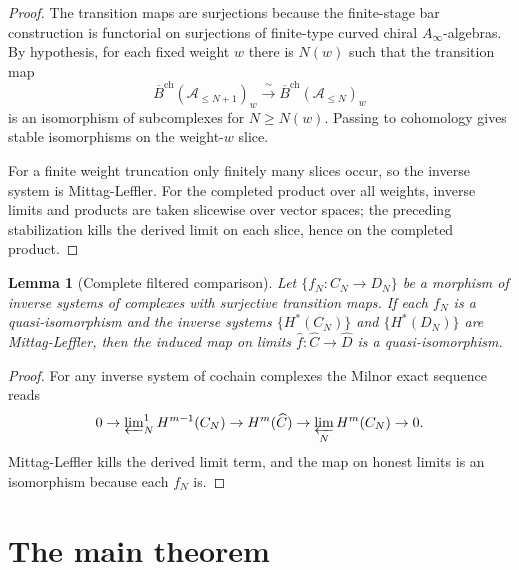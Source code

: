 \documentclass[11pt,reqno]{amsart}
\newtheorem{lemma}[theorem]{Lemma}
\theoremstyle{definition}
\theoremstyle{remark}
\newcommand{\cA}{\mathcal{A}}
\newcommand{\barB}{\overline{B}}
\newcommand{\Ainf}{A_\infty}
\numberwithin{equation}{section}
\begin{document}
\begin{proof}
The transition maps are surjections because the finite-stage bar
construction is functorial on surjections of finite-type curved
chiral $\Ainf$-algebras. By hypothesis, for each fixed weight
$w$ there is $N(w)$ such that the transition map
\[
\barB^{\mathrm{ch}}(\cA_{\le N+1})_w \xrightarrow{\ \sim\ }
\barB^{\mathrm{ch}}(\cA_{\le N})_w
\]
is an isomorphism of subcomplexes for $N\ge N(w)$. Passing to
cohomology gives stable isomorphisms on the weight-$w$ slice.

For a finite weight truncation only finitely many slices occur,
so the inverse system is Mittag-Leffler. For the completed
product over all weights, inverse limits and products are taken
slicewise over vector spaces; the preceding stabilization kills
the derived limit on each slice, hence on the completed product.
\end{proof}

\begin{lemma}[Complete filtered comparison]
\label{lem:filtered-comparison}
Let $\{f_N\colon C_N \to D_N\}$ be a morphism of inverse
systems of complexes with surjective transition maps. If each
$f_N$ is a quasi-isomorphism and the inverse systems
$\{H^*(C_N)\}$ and $\{H^*(D_N)\}$ are Mittag-Leffler, then
the induced map on limits
$\widehat f\colon \widehat C \to \widehat D$
is a quasi-isomorphism.
\end{lemma}

\begin{proof}
For any inverse system of cochain complexes the Milnor
exact sequence reads
\[
0 \to \varprojlim\nolimits^1_N H^{m-1}(C_N) \to
H^m(\widehat C) \to \varprojlim_N H^m(C_N) \to 0.
\]
Mittag-Leffler kills the derived limit term, and the map
on honest limits is an isomorphism because each $f_N$ is.
\end{proof}

\section{The main theorem}
\label{sec:main}
\end{document}
